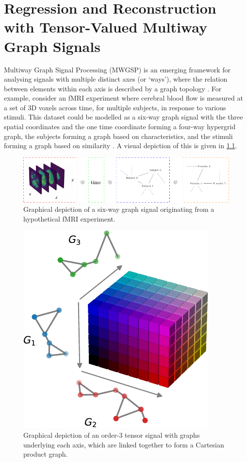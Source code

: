

\chapter{Regression and Reconstruction with Tensor-Valued
Multiway Graph Signals}


\label{chap:nd_gsp}


Multiway Graph Signal Processing (MWGSP) is an emerging framework for analysing signals with multiple distinct axes (or `ways'), where the relation between elements within each axis is described by a graph topology \citep{Stanley2020}. For example, consider an fMRI experiment where cerebral blood flow is measured at a set of 3D voxels across time, for multiple subjects, in response to various stimuli. This dataset could be modelled as a six-way graph signal with the three spatial coordinates and the one time coordinate forming a four-way hypergrid graph, the subjects forming a graph based on characteristics, and the stimuli forming a graph based on similarity \citep{Cichocki2015}. A visual depiction of this is given in \cref{fig:fMRI_diagram}. 
 
\vspace{1.5cm}

\begin{figure}[h] 
    \begin{center}
        \includegraphics[width=\linewidth]{Figures/fMRI_Digaram.pdf}
    \end{center}
   \caption[Graphical depiction of an order-3 tensor]{Graphical depiction of a six-way graph signal originating from a hypothetical fMRI experiment. } 
    \label{fig:fMRI_diagram}
\end{figure} 


\begin{figure}[b] 
    \begin{center}
        \includegraphics[width=0.4\linewidth]{Figures/coloured_tensor.pdf}
    \end{center}
   \caption[Graphical depiction of an order-3 tensor]{Graphical depiction of an order-3 tensor signal with graphs underlying each axis, which are linked together to form a Cartesian product graph.} 
    \label{fig:coloured_tensor}
\end{figure}  

